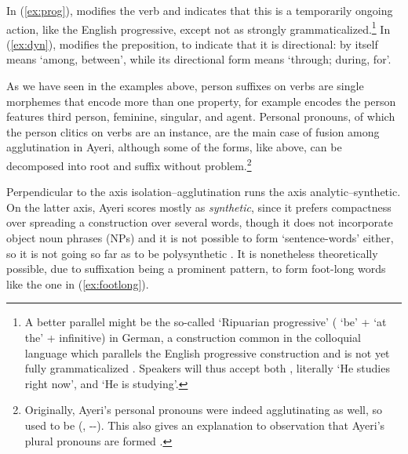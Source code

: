 In (\ref{ex:prog}),  modifies the verb 
and indicates that this is a temporarily ongoing action, like the English
progressive, except not as strongly grammaticalized.\footnote{A
better parallel might be the so-called  `Ripuarian
progressive' ( `be' +  `at the' + infinitive) in German, a
construction common in the colloquial language which parallels the English
progressive construction and is not yet fully grammaticalized
\citep[435]{dudengram2016}. Speakers will thus accept both , literally `He studies right now', and  `He is
studying'.
% 
}
%
In (\ref{ex:dyn}),  modifies the preposition,
to indicate that it is directional:  by itself means
`among, between', while its directional form  means
`through; during, for'.

As we have seen in the examples above, person suffixes on verbs are single 
morphemes that encode more than one property, for example  
encodes the person features third person, feminine, singular, and agent. 
Personal pronouns, of which the person clitics on 
verbs are an instance, are the main case of fusion among agglutination in 
Ayeri, although some of the forms, like  above, can 
be decomposed into root and suffix without problem.\footnote{Originally, 
Ayeri's personal pronouns were indeed agglutinating as well, so 
 used to be  (, 
\Tsg{}-\F{}-\Aarg{}). This also gives an explanation to  
observation that Ayeri's plural pronouns are formed .}

Perpendicular to the axis isolation--agglutination runs the axis 
analytic--syn\-thetic. On the latter axis, Ayeri scores mostly as 
\emph{synthetic}, since it prefers compactness over spreading a construction 
over several words, though it does not incorporate object noun phrases (NPs) 
and it is not possible to form `sentence-words' either, so it is not going so 
far as to be poly\-syn\-thetic \citep[45--46]{comrie1989}. It is nonetheless 
theoretically possible, due to suffixation being a prominent pattern, to form 
foot-long words like the one in (\ref{ex:footlong}).

